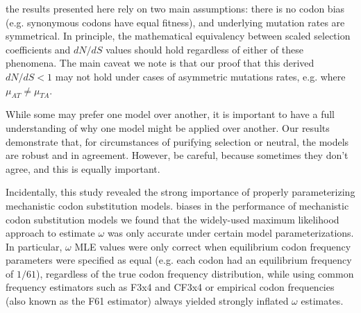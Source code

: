 \documentclass[11pt]{article}
\begin{document}
the results presented here rely on two main assumptions: there is no codon bias (e.g. synonymous codons have equal fitness), and underlying mutation rates are symmetrical. In principle, the mathematical equivalency between scaled selection coefficients and $dN/dS$ values should hold regardless of either of these phenomena. The main caveat we note is that our proof that this derived $dN/dS < 1$ may not hold under cases of asymmetric mutations rates, e.g. where $\mu_{AT} \neq \mu_{TA}$.

While some may prefer one model over another, it is important to have a full understanding of why one model might be applied over another. Our results demonstrate that, for circumstances of purifying selection or neutral, the models are robust and in agreement. However, be careful, because sometimes they don't agree, and this is equally important.

Incidentally, this study revealed the strong importance of properly parameterizing mechanistic codon substitution models. biases in the performance of mechanistic codon substitution models  we found that the widely-used maximum likelihood approach to estimate $\omega$ was only accurate under certain model parameterizations. In particular, $\omega$ MLE values were only correct when equilibrium codon frequency parameters were specified as equal (e.g. each codon had an equilibrium frequency of $1/61$), regardless of the true codon frequency distribution, while using common frequency estimators such as F3x4 \cite{MuseGaut1994} and CF3x4 \cite{Pond2010} or empirical codon frequencies (also known as the F61 estimator) always yielded strongly inflated $\omega$ estimates. 
\end{document}

